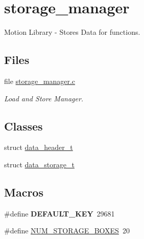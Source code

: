 \hypertarget{group___storage___manager}{}\section{storage\+\_\+manager}
\label{group___storage___manager}


Motion Library -\/ Stores Data for functions.  


\subsection*{Files}
\begin{DoxyCompactItemize}
\item 
file \hyperlink{storage__manager_8c}{storage\+\_\+manager.\+c}
\begin{DoxyCompactList}\small\item\em Load and Store Manager. \end{DoxyCompactList}\end{DoxyCompactItemize}
\subsection*{Classes}
\begin{DoxyCompactItemize}
\item 
struct \hyperlink{structdata__header__t}{data\+\_\+header\+\_\+t}
\item 
struct \hyperlink{structdata__storage__t}{data\+\_\+storage\+\_\+t}
\end{DoxyCompactItemize}
\subsection*{Macros}
\begin{DoxyCompactItemize}
\item 
\hypertarget{group___storage___manager_ga94d0ea06a79bb276020a641326ca85b8}{}\#define {\bfseries D\+E\+F\+A\+U\+L\+T\+\_\+\+K\+E\+Y}~29681\label{group___storage___manager_ga94d0ea06a79bb276020a641326ca85b8}

\item 
\#define \hyperlink{group___storage___manager_gaadd30991320c06b32469d747202380ec}{N\+U\+M\+\_\+\+S\+T\+O\+R\+A\+G\+E\+\_\+\+B\+O\+X\+E\+S}~20
\end{DoxyCompactItemize}

